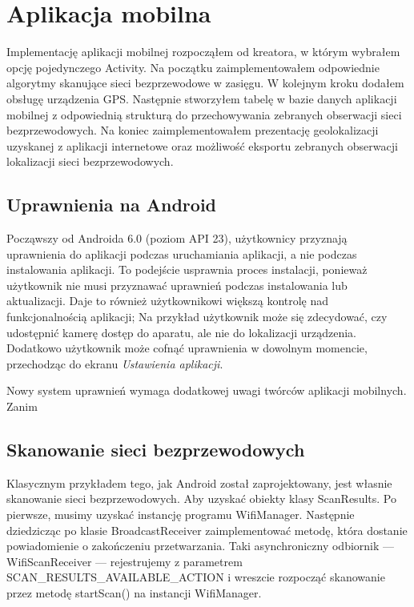 
\section{Aplikacja mobilna}
Implementację aplikacji mobilnej rozpocząłem od kreatora, w którym wybrałem opcję pojedynczego Activity. Na początku zaimplementowałem odpowiednie algorytmy skanujące sieci bezprzewodowe w zasięgu. W kolejnym kroku dodałem obsługę urządzenia GPS. Następnie stworzyłem tabelę w bazie danych aplikacji mobilnej z odpowiednią strukturą do przechowywania zebranych obserwacji sieci bezprzewodowych. Na koniec zaimplementowałem prezentację geolokalizacji uzyskanej z aplikacji internetowe oraz możliwość eksportu zebranych obserwacji lokalizacji sieci bezprzewodowych.

\subsection{Uprawnienia na Android}

Począwszy od Androida 6.0 (poziom API 23), użytkownicy przyznają uprawnienia do aplikacji podczas uruchamiania aplikacji, a nie podczas instalowania aplikacji. To podejście usprawnia proces instalacji, ponieważ użytkownik nie musi przyznawać uprawnień podczas instalowania lub aktualizacji. Daje to również użytkownikowi większą kontrolę nad funkcjonalnością aplikacji; Na przykład użytkownik może się zdecydować, czy udostępnić kamerę dostęp do aparatu, ale nie do lokalizacji urządzenia. Dodatkowo użytkownik może cofnąć uprawnienia w dowolnym momencie, przechodząc do ekranu \textit{Ustawienia aplikacji}.\cite{NewPermissionsModelInAndroid60}

Nowy system uprawnień wymaga dodatkowej uwagi twórców aplikacji mobilnych. Zanim

\subsection{Skanowanie sieci bezprzewodowych}
Klasycznym przykładem tego, jak Android został zaprojektowany, jest własnie skanowanie sieci bezprzewodowych. Aby uzyskać obiekty klasy ScanResults. Po pierwsze, musimy uzyskać instancję programu WifiManager. Następnie dziedzicząc po klasie BroadcastReceiver zaimplementować metodę, która dostanie powiadomienie o zakończeniu przetwarzania. Taki asynchroniczny odbiornik — WifiScanReceiver — rejestrujemy z parametrem SCAN\_RESULTS\_AVAILABLE\_ACTION i wreszcie rozpocząć skanowanie przez metodę startScan() na instancji WifiManager.

